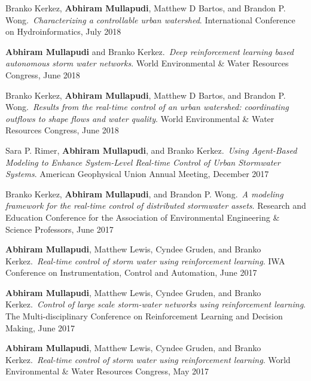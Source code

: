 \documentclass[a4paper,11pt]{article}
\newcommand{\years}[1]{%
  {\reversemarginpar\strut\marginnote{{\small#1}}}%
}
\begin{document}
\years{2018} Branko Kerkez, \textbf{Abhiram Mullapudi}, Matthew D Bartos, and Brandon P. Wong.\ \emph{Characterizing a controllable urban watershed}. International Conference on Hydroinformatics, July 2018\\[.1cm]

\years{2018} \textbf{Abhiram Mullapudi} and Branko Kerkez.\ \emph{Deep reinforcement learning based autonomous storm water networks}. World Environmental \& Water Resources Congress, June 2018\\[.1cm]

\years{2018} Branko Kerkez, \textbf{Abhiram Mullapudi}, Matthew D Bartos, and Brandon P. Wong.\ \emph{Results from the real-time control of an urban watershed: coordinating outflows to shape flows and water quality}. World Environmental \& Water Resources Congress, June 2018\\[.1cm]

\years{2017} Sara P. Rimer, \textbf{Abhiram Mullapudi}, and Branko Kerkez.\ \emph{Using Agent-Based Modeling to Enhance System-Level Real-time Control of Urban Stormwater Systems}. American Geophysical Union Annual Meeting, December 2017\\[.1cm]

\years{2017} Branko Kerkez, \textbf{Abhiram Mullapudi}, and Brandon P. Wong.\ \emph{A modeling framework for the real-time control of distributed stormwater assets}. Research and Education Conference for the Association of Environmental Engineering \& Science Professors, June 2017\\[.1cm]

\years{2017} \textbf{Abhiram Mullapudi}, Matthew Lewis, Cyndee Gruden, and Branko Kerkez.\ \emph{Real-time control of storm water using reinforcement learning}. IWA Conference on Instrumentation, Control and Automation, June 2017\\[.1cm]

\years{2017} \textbf{Abhiram Mullapudi}, Matthew Lewis, Cyndee Gruden, and Branko Kerkez.\ \emph{Control of large scale storm-water networks using reinforcement learning}. The Multi-disciplinary Conference on Reinforcement Learning and Decision Making, June 2017\\[.1cm]

\years{2017} \textbf{Abhiram Mullapudi}, Matthew Lewis, Cyndee Gruden, and Branko Kerkez.\ \emph{Real-time control of storm water using reinforcement learning}. World Environmental \& Water Resources Congress, May 2017\\[.1cm]
\end{document}
